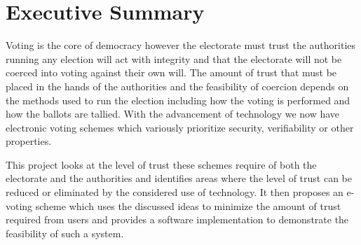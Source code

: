 \newpage
{}
\thispagestyle{plain}

\vspace*{\fill}

\section*{Executive Summary}


Voting is the core of democracy however the electorate must trust the authorities running any election will act with integrity and that the electorate will not be coerced into voting against their own will.
The amount of trust that must be placed in the hands of the authorities and the feasibility of coercion depends on the methods used to run the election including how the voting is performed and how the ballots are tallied.
With the advancement of technology we now have electronic voting schemes which variously prioritize security, verifiability or other properties.


This project looks at the level of trust these schemes require of both the electorate and the authorities and identifies areas where the level of trust can be reduced or eliminated by the considered use of technology.
It then proposes an e-voting scheme which uses the discussed ideas to minimize the amount of trust required from users and provides a software implementation to demonstrate the feasibility of such a system.

\vspace*{\fill}
